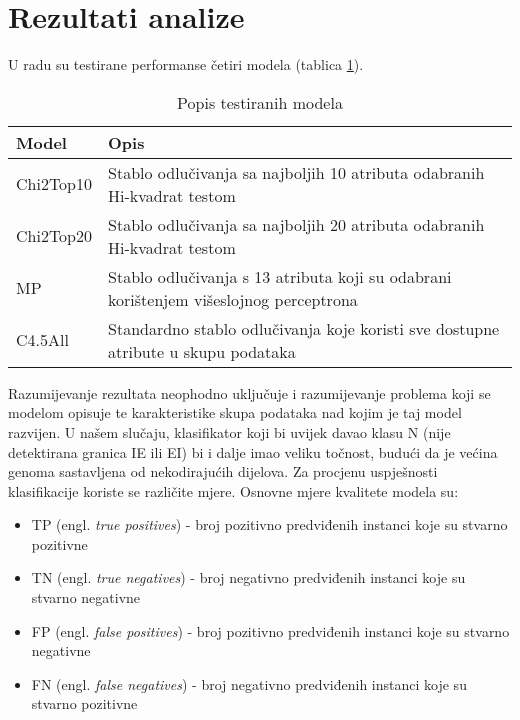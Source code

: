 \section{Rezultati analize}
\label{ch:ch5}

U radu su testirane performanse četiri modela (tablica \ref{tab:models}).

\begin{table}[!ht]
    \centering
    \caption[Popis testiranih modela]{Popis testiranih modela}
    \label{tab:models}
    \begin{tabular}{|| p{2cm} | p{13cm} ||}
            \hline
            Model & Opis \\ [0.5ex]
            \hline
            \hline
            Chi2Top10 & Stablo odlučivanja sa najboljih 10 atributa odabranih Hi-kvadrat testom \\
            \hline
            Chi2Top20 & Stablo odlučivanja sa najboljih 20 atributa odabranih Hi-kvadrat testom \\
            \hline
            MP & Stablo odlučivanja s 13 atributa koji su odabrani korištenjem višeslojnog perceptrona \\
            \hline
            C4.5All & Standardno stablo odlučivanja koje koristi sve dostupne atribute u skupu podataka \\ [1ex]
            \hline
    \end{tabular}
\end{table}
Razumijevanje rezultata neophodno uključuje i razumijevanje problema koji se modelom opisuje te karakteristike skupa podataka nad kojim je taj model razvijen. U našem slučaju, klasifikator koji bi uvijek davao klasu N (nije detektirana granica IE ili EI) bi i dalje imao veliku točnost, budući da je većina genoma sastavljena od nekodirajućih dijelova. Za procjenu uspješnosti klasifikacije koriste se različite mjere. 
Osnovne mjere kvalitete modela su:
\begin{itemize}
   \item TP (engl. \textit{true positives}) - broj pozitivno predviđenih instanci koje su stvarno pozitivne
   \item TN (engl. \textit{true negatives}) - broj negativno predviđenih instanci koje su stvarno negativne
   \item FP (engl. \textit{false positives}) - broj pozitivno predviđenih instanci koje su stvarno negativne
   \item FN (engl. \textit{false negatives}) - broj negativno predviđenih instanci koje su stvarno pozitivne
\end{itemize}
